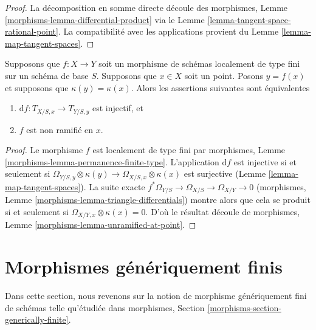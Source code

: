 \begin{proof}
La décomposition en somme directe découle des morphismes,
Lemme \ref{morphisms-lemma-differential-product} via le Lemme
\ref{lemma-tangent-space-rational-point}. La compatibilité avec
les applications provient du Lemme \ref{lemma-map-tangent-spaces}.
\end{proof}

\begin{lemma}
\label{lemma-injective-tangent-spaces-unramified}
Supposons que $f : X \to Y$ soit un morphisme de schémas localement de type fini sur
un schéma de base $S$. Supposons que $x \in X$ soit un point. Posons $y = f(x)$ et
supposons que $\kappa(y) = \kappa(x)$. Alors les assertions suivantes sont équivalentes
\begin{enumerate}
\item $\text{d}f : T_{X/S, x} \longrightarrow T_{Y/S,
y}$ est injectif, et \item $f$ est non ramifié en $x$.
\end{enumerate}
\end{lemma}

\begin{proof}
Le morphisme $f$ est localement de type fini par
morphismes, Lemme
\ref{morphisms-lemma-permanence-finite-type}. L'application
$\text{d}f$ est injective si et seulement si $\Omega_{Y/S, y}
\otimes \kappa(y) \to \Omega_{X/S, x} \otimes \kappa(x)$ est
surjective (Lemme \ref{lemma-map-tangent-spaces}). La suite
exacte $f^*\Omega_{Y/S} \to \Omega_{X/S} \to \Omega_{X/Y} \to
0$ (morphismes, Lemme
\ref{morphisms-lemma-triangle-differentials}) montre alors que cela se
produit si et seulement si $\Omega_{X/Y, x} \otimes \kappa(x) = 0$. D'où le
résultat découle de morphismes, Lemme \ref{morphisms-lemma-unramified-at-point}.
\end{proof}







\section{Morphismes génériquement finis}
\label{section-generically-finite}

\noindent
Dans cette section, nous revenons sur la notion de
morphisme génériquement fini de schémas telle qu'étudiée dans
morphismes, Section \ref{morphisms-section-generically-finite}.

